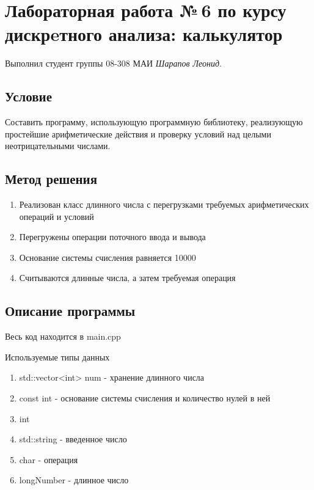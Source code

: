 \documentclass[12pt]{article}
\begin{document}
\section*{Лабораторная работа №\,6 по курсу дискрeтного анализа: калькулятор}

Выполнил студент группы 08-308 МАИ \textit{Шарапов Леонид}.

\subsection*{Условие}

Составить программу, использующую программную библиотеку, реализующую простейшие арифметические действия и проверку условий над целыми неотрицательными числами.

\subsection*{Метод решения}

\begin{enumerate}
\item Реализован класс длинного числа с перегрузками требуемых арифметических операций и условий
\item Перегружены операции поточного ввода и вывода
\item Основание системы счисления равняется 10000
\item Считываются длинные числа, а затем требуемая операция
\end{enumerate}

\subsection*{Описание программы}

Весь код находится в main.cpp

Используемые типы данных
\begin{enumerate}
\item std::vector<int> num - хранение длинного числа
\item const int - основание системы счисления и количество нулей в ней
\item int
\item std::string - введенное число
\item char - операция
\item longNumber - длинное число
\end{enumerate}
\end{document}

